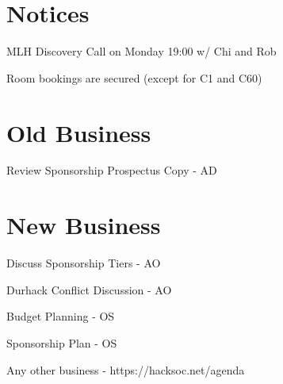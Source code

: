 \documentclass[11pt,hacksoc, agenda]{meetingmins}
\begin{document}
\maketitle

\section{Notices}
\begin{items}
  \item MLH Discovery Call on Monday 19:00 w/ Chi and Rob
  \item Room bookings are secured (except for C1 and C60)
\end{items}

\section{Old Business}
\begin{items}
  \item Review Sponsorship Prospectus Copy - AD
\end{items}

\section{New Business}
\begin{items}
  \item Discuss Sponsorship Tiers - AO
  \item Durhack Conflict Discussion - AO
  \item Budget Planning - OS
  \item Sponsorship Plan - OS
  \item Any other business - https://hacksoc.net/agenda
\end{items}

\vspace{1em}
\nextmeeting{}
\end{document}
